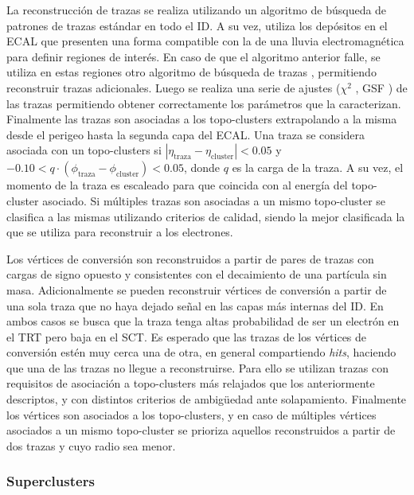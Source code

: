 La reconstrucción de trazas se realiza utilizando un algoritmo de búsqueda de patrones de trazas estándar
\cite{newt, PERF-2017-02, PERF-2017-01} en todo el ID. A su vez, utiliza los depósitos en el ECAL que presenten una forma compatible con la de una lluvia electromagnética para definir regiones de interés. En caso de que el algoritmo anterior falle, se utiliza en estas regiones otro algoritmo de búsqueda de trazas \cite{Kalman}, permitiendo reconstruir trazas adicionales. Luego se realiza una serie de ajustes ($\chi^2$ \cite{chi2}, GSF \cite{gsf}) de las trazas permitiendo obtener correctamente los parámetros que la caracterizan. Finalmente las trazas son asociadas a los topo-clusters extrapolando a la misma desde el perigeo hasta la segunda capa del ECAL. Una traza se considera asociada con un topo-clusters si $|\eta_{\text{traza}}-\eta_{\text{cluster}}|<0.05$ y $-0.10<q\cdot(\phi_{\text{traza}}-\phi_{\text{cluster}})<0.05$, donde $q$ es la carga de la traza. A su vez, el momento de la traza es escaleado para que coincida con al energía del topo-cluster asociado. Si múltiples trazas son asociadas a un mismo topo-cluster se clasifica a las mismas utilizando criterios de calidad, siendo la mejor clasificada la que se utiliza para reconstruir a los electrones. 

Los vértices de conversión son reconstruidos a partir de pares de trazas con cargas de signo opuesto y consistentes con el decaimiento de una partícula sin masa. Adicionalmente se pueden reconstruir vértices de conversión a partir de una sola traza que no haya dejado señal en las capas más internas del ID. En ambos casos se busca que la traza tenga altas probabilidad de ser un electrón en el TRT \cite{trt} pero baja en el SCT. Es esperado que las trazas de los vértices de conversión estén muy cerca una de otra, en general compartiendo \textit{hits}, haciendo que una de las trazas no llegue a reconstruirse. Para ello se utilizan trazas con requisitos de asociación a topo-clusters más relajados que los anteriormente descriptos, y con distintos criterios de ambigüedad ante solapamiento. Finalmente los vértices son asociados a los topo-clusters, y en caso de múltiples vértices asociados a un mismo topo-cluster se prioriza aquellos reconstruidos a partir de dos trazas y cuyo radio sea menor.

\subsubsection{Superclusters}

